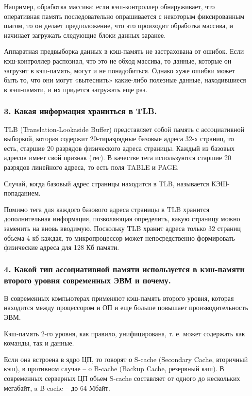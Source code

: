 Например, обработка массива: если кэш-контроллер обнаруживает, что оперативная память последовательно опрашивается с некоторым фиксированным шагом, то он делает предположение, что это проиходит обработка массива, и начинает загружать следующие блоки данных заранее.

Аппаратная предвыборка данных в кэш-память не застрахована от ошибок. Если кэш-контроллер распознал, что это не обход массива, то данные, которые он загрузит в кэш-память, могут и не понадобиться. Однако хуже ошибки может быть то, что они могут «вытеснить» какие-либо полезные данные, находившиеся в кэш-памяти, и их придется загружать еще раз. 

\subsubsection{3. Какая информация храниться в TLB.}
TLB (Translation-Lookaside Buffer) представляет собой память с ассоциативной выборкой, которая содержит 20-тиразрядные базовые адреса 32-х страниц, то есть, старшие 20 разрядов физического адреса страницы. Каждый из базовых адресов имеет свой признак (тег). В качестве тега используются старшие 20 разрядов линейного адреса, то есть поля TABLE и PAGE.

Случай, когда базовый адрес страницы находится в TLB, называется КЭШ-попаданием. 

Помимо тега для каждого базового адреса страницы в TLB хранится дополнительная информация, позволяющая определить, какую страницу можно заменить на вновь вводимую. Поскольку TLB хранит адреса только 32 страниц объема 4 кб каждая, то микропроцессор может непосредственно формировать физические адреса для 128 Кб памяти.

\subsubsection{4. Какой тип ассоциативной памяти используется в кэш-памяти второго уровня современных ЭВМ и почему.}

В современных компьютерах применяют кэш-память второго уровня, которая находится между процессором и ОП и еще больше повышает производительность ЭВМ.

Кэш-память 2-го уровня, как правило, унифицирована, т. е. может содержать как команды, так и данные.

Если она встроена в ядро ЦП, то говорят о S-cache (Secondary Cache, вторичный кэш), в противном случае -- о B-cache (Backup Cache, резервный кэш). В современных серверных ЦП объем S-cache составляет от одного до нескольких мегабайт, a B-cache -- до 64 Мбайт. 

